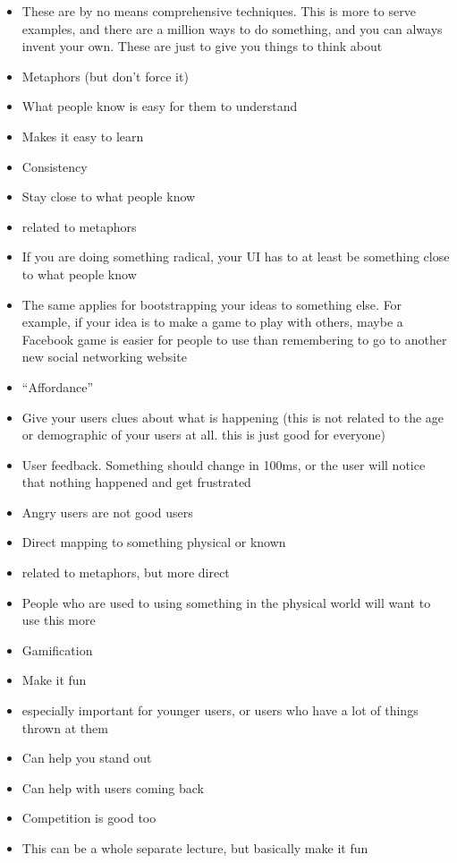 \begin{itemize}
\item
  These are by no means comprehensive techniques. This is more to serve
  examples, and there are a million ways to do something, and you can
  always invent your own. These are just to give you things to think
  about
\item
  Metaphors (but don't force it)
\item
  What people know is easy for them to understand
\item
  Makes it easy to learn
\end{itemize}
\begin{itemize}
\item
  Consistency
\item
  Stay close to what people know
\item
  related to metaphors
\item
  If you are doing something radical, your UI has to at least be
  something close to what people know
\item
  The same applies for bootstrapping your ideas to something else. For
  example, if your idea is to make a game to play with others, maybe a
  Facebook game is easier for people to use than remembering to go to
  another new social networking website
\end{itemize}
\begin{itemize}
\item
  ``Affordance''
\item
  Give your users clues about what is happening (this is not related to
  the age or demographic of your users at all. this is just good for
  everyone)
\end{itemize}
\begin{itemize}
\item
  User feedback. Something should change in 100ms, or the user will
  notice that nothing happened and get frustrated
\item
  Angry users are not good users
\end{itemize}
\begin{itemize}
\item
  Direct mapping to something physical or known
\item
  related to metaphors, but more direct
\item
  People who are used to using something in the physical world will want
  to use this more
\end{itemize}
\begin{itemize}
\item
  Gamification
\item
  Make it fun
\item
  especially important for younger users, or users who have a lot of
  things thrown at them
\item
  Can help you stand out
\item
  Can help with users coming back
\item
  Competition is good too
\item
  This can be a whole separate lecture, but basically make it fun
\end{itemize}

